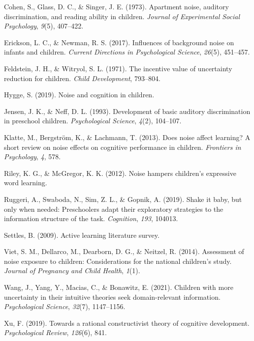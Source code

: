 \documentclass[10pt, letterpaper]{article}
\begin{document}
\leavevmode\hypertarget{ref-cohen1973}{}%
Cohen, S., Glass, D. C., \& Singer, J. E. (1973). Apartment noise,
auditory discrimination, and reading ability in children. \emph{Journal
of Experimental Social Psychology}, \emph{9}(5), 407--422.

\leavevmode\hypertarget{ref-erickson2017}{}%
Erickson, L. C., \& Newman, R. S. (2017). Influences of background noise
on infants and children. \emph{Current Directions in Psychological
Science}, \emph{26}(5), 451--457.

\leavevmode\hypertarget{ref-feldstein1971}{}%
Feldstein, J. H., \& Witryol, S. L. (1971). The incentive value of
uncertainty reduction for children. \emph{Child Development}, 793--804.

\leavevmode\hypertarget{ref-hygge2019}{}%
Hygge, S. (2019). Noise and cognition in children.

\leavevmode\hypertarget{ref-jensen1993}{}%
Jensen, J. K., \& Neff, D. L. (1993). Development of basic auditory
discrimination in preschool children. \emph{Psychological Science},
\emph{4}(2), 104--107.

\leavevmode\hypertarget{ref-klatte2013}{}%
Klatte, M., Bergström, K., \& Lachmann, T. (2013). Does noise affect
learning? A short review on noise effects on cognitive performance in
children. \emph{Frontiers in Psychology}, \emph{4}, 578.

\leavevmode\hypertarget{ref-riley2012}{}%
Riley, K. G., \& McGregor, K. K. (2012). Noise hampers children's
expressive word learning.

\leavevmode\hypertarget{ref-ruggeri2019}{}%
Ruggeri, A., Swaboda, N., Sim, Z. L., \& Gopnik, A. (2019). Shake it
baby, but only when needed: Preschoolers adapt their exploratory
strategies to the information structure of the task. \emph{Cognition},
\emph{193}, 104013.

\leavevmode\hypertarget{ref-settles2009}{}%
Settles, B. (2009). Active learning literature survey.

\leavevmode\hypertarget{ref-viet2014}{}%
Viet, S. M., Dellarco, M., Dearborn, D. G., \& Neitzel, R. (2014).
Assessment of noise exposure to children: Considerations for the
national children's study. \emph{Journal of Pregnancy and Child Health},
\emph{1}(1).

\leavevmode\hypertarget{ref-wang2021}{}%
Wang, J., Yang, Y., Macias, C., \& Bonawitz, E. (2021). Children with
more uncertainty in their intuitive theories seek domain-relevant
information. \emph{Psychological Science}, \emph{32}(7), 1147--1156.

\leavevmode\hypertarget{ref-xu2019}{}%
Xu, F. (2019). Towards a rational constructivist theory of cognitive
development. \emph{Psychological Review}, \emph{126}(6), 841.


\end{document}
